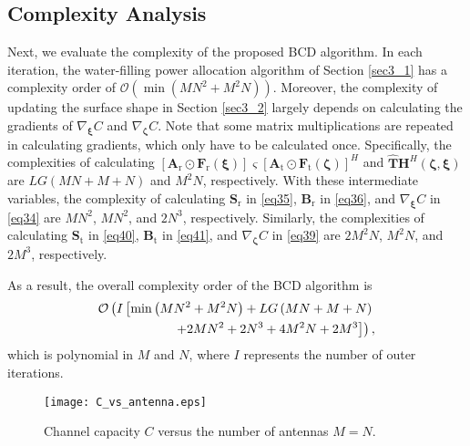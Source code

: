 \documentclass[lettersize,journal]{IEEEtran}
\begin{document}
\subsection{Complexity Analysis}
Next, we evaluate the complexity of the proposed BCD algorithm. In each iteration, the water-filling power allocation algorithm of Section \ref{sec3_1} has a complexity order of $\mathcal{O}\left (\min\left ( MN^{2}+M^{2}N \right )\right )$. Moreover, the complexity of updating the surface shape in Section \ref{sec3_2} largely depends on calculating the gradients of $\nabla_{\boldsymbol{\xi} } C$ and $\nabla_{\boldsymbol{\zeta} } C$. Note that some matrix multiplications are repeated in calculating gradients, which only have to be calculated once. Specifically, the complexities of calculating $\left [ \mathbf{A}_{\textrm{r}}\odot \mathbf{F}_{\textrm{r}}\left ( \boldsymbol{\xi} \right ) \right ]\boldsymbol{\varsigma } \left [ \mathbf{A}_{\textrm{t}}\odot \mathbf{F}_{\textrm{t}}\left ( \boldsymbol{\zeta} \right ) \right ]^{H}$ and $\hat{\mathbf{T}}\mathbf{H}^{H}\left ( \boldsymbol{\zeta},\boldsymbol{\xi} \right )$ are $LG\left ( MN+M+N \right )$ and $M^2N$, respectively. With these intermediate variables, the complexity of calculating $\mathbf{S}_{\textrm{r}}$ in \eqref{eq35}, $\mathbf{B}_{\textrm{r}}$ in \eqref{eq36}, and $\nabla_{\boldsymbol{\xi} } C$ in \eqref{eq34} are $MN^2$, $MN^2$, and $2N^3$, respectively. Similarly, the complexities of calculating $\mathbf{S}_{\textrm{t}}$ in \eqref{eq40}, $\mathbf{B}_{\textrm{t}}$ in \eqref{eq41}, and $\nabla_{\boldsymbol{\zeta} } C$ in \eqref{eq39} are $2M^2N$, $M^2N$, and $2M^3$, respectively.

As a result, the overall complexity order of the BCD algorithm is
\begin{align}
 \mathcal{O}\left ( I\left [\min\left ( MN^{2}+M^{2}N \right )+LG\left ( MN+M+N \right )\right.\right. \notag\\
 \left.\left.+2MN^2+2N^3+4M^2N+2M^3\right ]\right ),
\end{align}
which is polynomial in $M$ and $N$, where $I$ represents the number of outer iterations.







\begin{figure}[!t]
\centering
\texttt{[image: C\_vs\_antenna.eps]}
\caption{Channel capacity $C$ versus the number of antennas $M = N$.}
\label{fig_4}
\end{figure}
\end{document}
